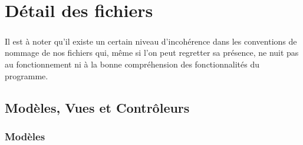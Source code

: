 \chapter{Détail des fichiers}

\paragraph{}
    Il est à noter qu'il existe un certain niveau d'incohérence dans les
    conventions de nommage de nos fichiers qui, même si l'on peut regretter
    sa présence, ne nuit pas au fonctionnement ni à la bonne compréhension
    des fonctionnalités du programme.

\section{Modèles, Vues et Contrôleurs}
    \subsection{Modèles}

